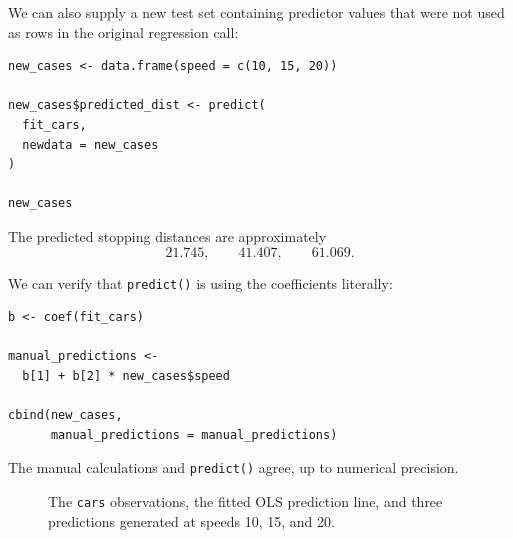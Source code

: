 \documentclass[11pt]{report}
\begin{document}
We can also supply a new test set containing predictor values that were not used as rows in the original regression call:

\begin{lstlisting}
new_cases <- data.frame(speed = c(10, 15, 20))

new_cases$predicted_dist <- predict(
  fit_cars,
  newdata = new_cases
)

new_cases
\end{lstlisting}

The predicted stopping distances are approximately
\[
21.745,\qquad 41.407,\qquad 61.069.
\]

We can verify that \texttt{predict()} is using the coefficients literally:

\begin{lstlisting}
b <- coef(fit_cars)

manual_predictions <-
  b[1] + b[2] * new_cases$speed

cbind(new_cases,
      manual_predictions = manual_predictions)
\end{lstlisting}

The manual calculations and \texttt{predict()} agree, up to numerical precision.

\begin{figure}[H]
\centering
{}
\caption{The \texttt{cars} observations, the fitted OLS prediction line, and three predictions generated at speeds 10, 15, and 20.}
\label{fig:carspredict}
\end{figure}
\end{document}
